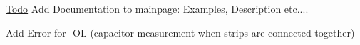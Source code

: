 \begin{Desc}
\item[\hyperlink{todo__todo000001}{Todo}]Add Documentation to mainpage: Examples, Description etc.... 

Add Error for -\/OL (capacitor measurement when strips are connected together) \end{Desc}
